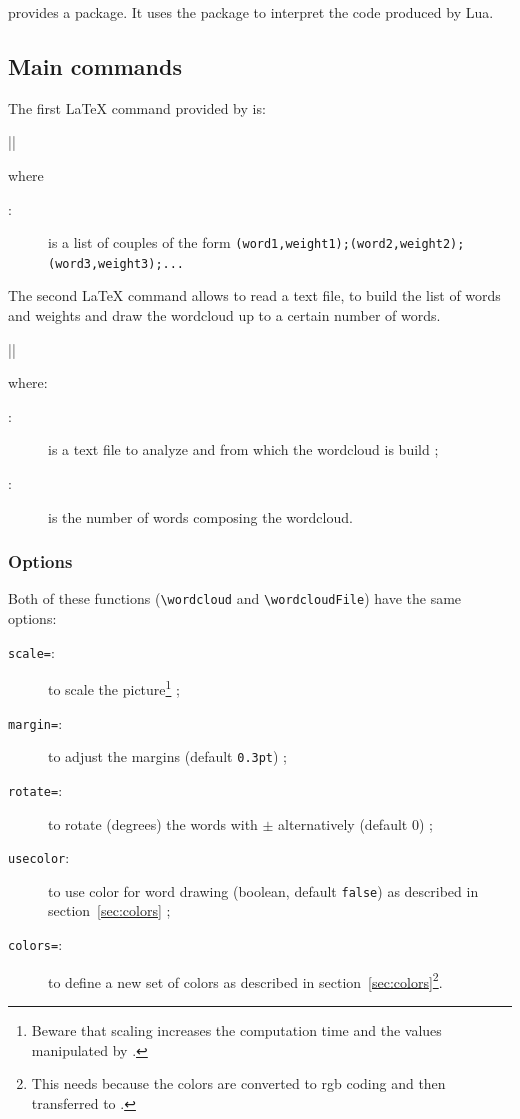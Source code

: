\documentclass[english]{ltxdoc}
\begin{document}
 provides a  package. It uses the package
 to interpret the  code produced by Lua. 


\subsection{Main commands}

The first \LaTeX{} command provided by \wordcloudpkg is:

\commande||\smallskip\index{\wordcloud@\lstinline+\wordcloud+}

where
\begin{description}
  \item[:] is a list of couples of the form
  \lstinline+(word1,weight1);(word2,weight2);(word3,weight3);...+
\end{description}

The second \LaTeX{} command allows to read a text file, to build the list of
words and weights and draw the wordcloud up to a certain number of words.

\commande||\smallskip\index{\wordcloudFile@\lstinline+\wordcloudFile+}

where:
\begin{description}
  \item[:] is a text file to analyze and from which the
  wordcloud is build ;
  \item[:] is the number of words composing the wordcloud.  
\end{description}

\subsubsection{Options}

Both of these functions (\lstinline+\wordcloud+ and \lstinline+\wordcloudFile+)
have the same options:

\begin{description}
  \item[\texttt{scale=}:] to scale the picture\footnote{Beware
  that scaling increases the computation time and the values manipulated by
  .} ;
  \item[\texttt{margin=}:] to adjust the margins
  (default \lstinline+0.3pt+) ;
  \item[\texttt{rotate=}:] to rotate (degrees) the words with
  $\pm$ alternatively (default 0) ;
  \item[\texttt{usecolor}:] to use color for word drawing (boolean, default
  \lstinline+false+) as described in section~\ref{sec:colors} ;
  \item[\texttt{colors=}:] to define a new
  set of colors as described in section~\ref{sec:colors}\footnote{This needs
   because the colors are converted to rgb coding and then
  transferred to .}.
\end{description}
  
\end{document}
